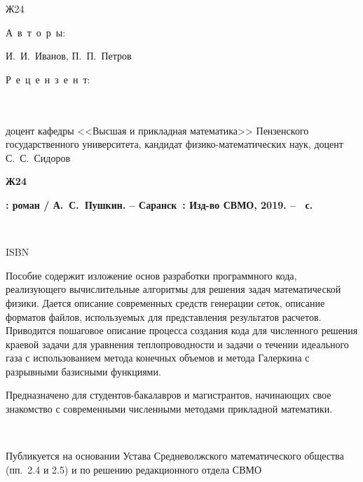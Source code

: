 \hspace{1.25cm}Ж24
\ \\
	\vspace{1cm}
	\begin{center}
	\parbox{160mm}{
		\parbox{43mm}{
			А~в~т~о~р~ы:
		}
		\parbox{117mm}{
			И.~И.~Иванов, П.~П.~Петров
		}
	}
	\end{center}
	\vspace{0.3cm}
	\begin{center}
		\parbox{160mm}{
			\parbox{43mm}{
				Р~е~ц~е~н~з~е~н~т:\\ \\ \\
			}
			\parbox{117mm}{
				доцент кафедры <<Высшая и прикладная математика>> Пензенского государственного университета, кандидат физико-математических наук, доцент С.~С.~Сидоров
			}
		}
	\end{center}
	\vspace{0.3cm}
	\parbox{160mm}{%
		\parbox{13mm}{\vspace{-1mm}\bfseries Ж24}
		\parbox{147mm}{\bfseries \hspace{5mm} \zhrvTitle: роман / А.~С.~Пушкин. -- Саранск~: Изд-во СВМО, 2019. -- \pageref{LastPage}~с.}
	}\par
	\vspace{0.6cm}
	\parbox{160mm}{%
		\parbox{7mm}{\ }
		\parbox{153mm}{
			ISBN \zhrvISBN
			
			\vspace{0.6cm}
			{\small Пособие 
			содержит изложение основ разработки программного кода, реализующего вычислительные алгоритмы для решения задач математической физики. Дается описание современных средств генерации сеток, описание форматов файлов, используемых для представления результатов расчетов. Приводится пошаговое описание процесса создания кода для численного решения краевой задачи для  уравнения теплопроводности и задачи о течении идеального газа с использованием метода конечных объемов и метода Галеркина с разрывными базисными функциями.
			
			
			Предназначено для студентов-бакалавров и магистрантов, начинающих свое знакомство с современными численными методами прикладной математики.
			\par}
		}
	}\par
	\vspace{2.6cm}
	\parbox{160mm}{%
		\parbox{7mm}{\ }
		\parbox{153mm}{
			Публикуется на основании Устава Средневолжского математического общества (пп.~2.4 и 2.5) и по решению редакционного отдела СВМО
		}
	}
	
